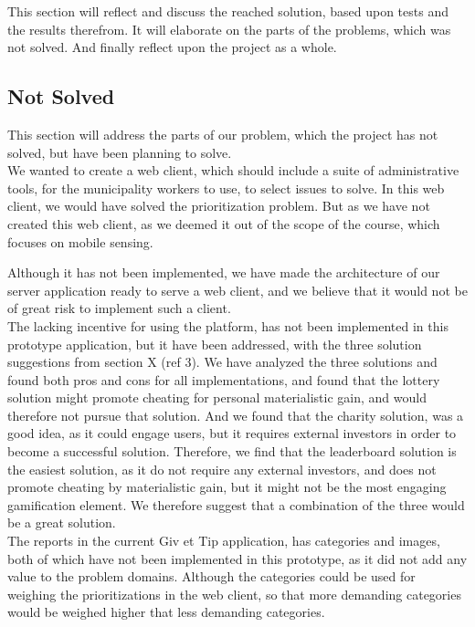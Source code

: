 This section will reflect and discuss the reached solution, based upon tests and the results therefrom. It will elaborate on the parts of the problems, which was not solved. And finally reflect upon the project as a whole.

\subsection{Not Solved}
This section will address the parts of our problem, which the project has not solved, but have been planning to solve.
~\\

We wanted to create a web client, which should include a suite of administrative tools, for the municipality workers to use, to select issues to solve. In this web client, we would have solved the prioritization problem. But as we have not created this web client, as we deemed it out of the scope of the course, which focuses on mobile sensing.

Although it has not been implemented, we have made the architecture of our server application ready to serve a web client, and we believe that it would not be of great risk to implement such a client.
~\\

The lacking incentive for using the platform, has not been implemented in this prototype application, but it have been addressed, with the three solution suggestions from section X (ref 3). We have analyzed the three solutions and found both pros and cons for all implementations, and found that the lottery solution might promote cheating for personal materialistic gain, and would therefore not pursue that solution. And we found that the charity solution, was a good idea, as it could engage users, but it requires external investors in order to become a successful solution. Therefore, we find that the leaderboard solution is the easiest solution, as it do not require any external investors, and does not promote cheating by materialistic gain, but it might not be the most engaging gamification element. We therefore suggest that a combination of the three would be a great solution.
~\\

The reports in the current Giv et Tip application, has categories and images, both of which have not been implemented in this prototype, as it did not add any value to the problem domains. Although the categories could be used for weighing the prioritizations in the web client, so that more demanding categories would be weighed higher that less demanding categories.

